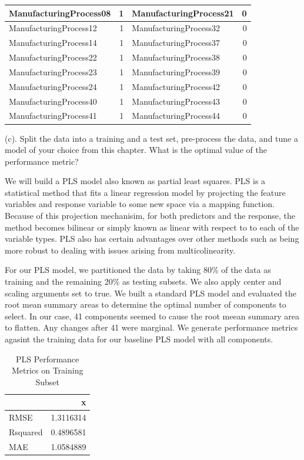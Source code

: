 \documentclass[]{report}
\begin{document}
\begin{table}[H]
\begin{tabular}[t]{l|r|l|r}
\hline
\rowcolor{gray!6}  ManufacturingProcess08 & 1 & ManufacturingProcess21 & 0\\
\hline
ManufacturingProcess12 & 1 & ManufacturingProcess32 & 0\\
\hline
\rowcolor{gray!6}  ManufacturingProcess14 & 1 & ManufacturingProcess37 & 0\\
\hline
ManufacturingProcess22 & 1 & ManufacturingProcess38 & 0\\
\hline
\rowcolor{gray!6}  ManufacturingProcess23 & 1 & ManufacturingProcess39 & 0\\
\hline
ManufacturingProcess24 & 1 & ManufacturingProcess42 & 0\\
\hline
\rowcolor{gray!6}  ManufacturingProcess40 & 1 & ManufacturingProcess43 & 0\\
\hline
ManufacturingProcess41 & 1 & ManufacturingProcess44 & 0\\
\hline
\end{tabular}
\end{table}

\begin{subquestion}{(c).} Split the data into a training and a test set, pre-process the data, and tune a model of your choice from this chapter. What is the optimal value of the performance metric? 
\end{subquestion}

We will build a PLS model also known as partial least squares. PLS is a
statistical method that fits a linear regression model by projecting the
feature variables and response variable to some new space via a mapping
function. Because of this projection mechanisim, for both predictors and
the response, the method becomes bilinear or simply known as linear with
respect to to each of the variable types. PLS also has certain
advantages over other methods such as being more robust to dealing with
issues arising from multicolinearity.

For our PLS model, we partitioned the data by taking 80\% of the data as
training and the remaining 20\% as testing subsets. We also apply center
and scaling arguments set to true. We built a standard PLS model and
evaluated the root mean summary areas to determine the optimal number of
components to select. In our case, 41 components seemed to cause the
root meean summary area to flatten. Any changes after 41 were marginal.
We generate performance metrics agasint the training data for our
baseline PLS model with all components.

\begin{table}[H]

\caption{\label{tab:kj-6.3c}PLS Performance Metrics on Training Subset}
\centering
\begin{tabular}[t]{l|r}
\hline
  & x\\
\hline
\rowcolor{gray!6}  RMSE & 1.3116314\\
\hline
Rsquared & 0.4896581\\
\hline
\rowcolor{gray!6}  MAE & 1.0584889\\
\hline
\end{tabular}
\end{table}
\end{document}
